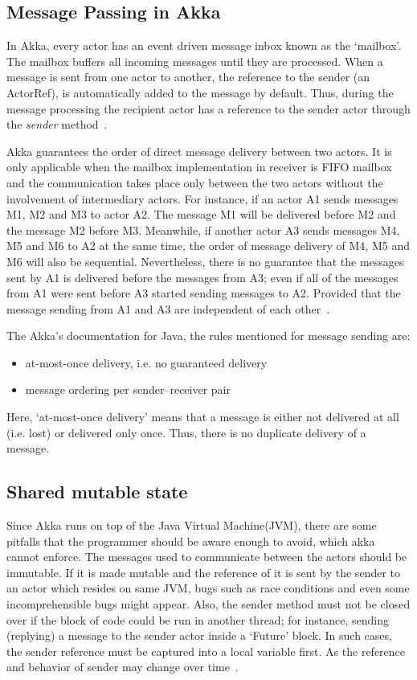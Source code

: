   \subsection{Message Passing in Akka}
  \label{subsec:akkaMessagePassing}
  In Akka, every actor has an event driven message inbox known as the ‘mailbox’. The mailbox buffers all incoming messages until they are processed. When a message is sent from one actor to another, the reference to the sender (an ActorRef), is automatically added to the message by default. Thus, during the message processing the recipient actor has a reference to the sender actor through the \emph{sender} method~\cite{akkaJavaDoc}.

  Akka guarantees the order of direct message delivery between two actors. It is only applicable when the mailbox implementation in receiver is FIFO mailbox and the communication takes place only between the two actors without the involvement of intermediary actors. For instance, if an actor A1 sends messages M1, M2 and M3 to actor A2. The message M1 will be delivered before M2 and the message M2 before M3. Meanwhile, if another actor A3 sends messages M4, M5 and M6 to A2 at the same time, the order of message delivery of M4, M5 and M6 will also be sequential. Nevertheless, there is no guarantee that the messages sent by A1 is delivered before the messages from A3; even if all of the messages from A1 were sent before A3 started sending messages to A2. Provided that the message sending from A1 and A3 are independent of each other~\cite{akkaJavaDoc}.

  The Akka's documentation for Java, the rules mentioned for message sending are: \cite{akkaJavaDoc}
  \begin{itemize}
    \item at-most-once delivery, i.e. no guaranteed delivery
    \item message ordering per sender–receiver pair
  \end{itemize}

Here, ‘at-most-once delivery’ means that a message is either not delivered at all (i.e. lost) or delivered only once. Thus, there is no duplicate delivery of a message.

  \subsection{Shared mutable state}
  Since Akka runs on top of the Java Virtual Machine(JVM), there are some pitfalls that the programmer should be aware enough to avoid, which akka cannot enforce. The messages used to communicate between the actors should be immutable. If it is made mutable and the reference of it is sent by the sender to an actor which resides on same JVM, bugs such as race conditions and even some incomprehensible bugs might appear. Also, the sender method must not be closed over if the block of code could be run in another thread; for instance, sending (replying) a message to the sender actor inside a ‘Future’ block. In such cases, the sender reference must be captured into a local variable first. As the reference and behavior of sender may change over time~\cite{akkaJavaDoc}.


